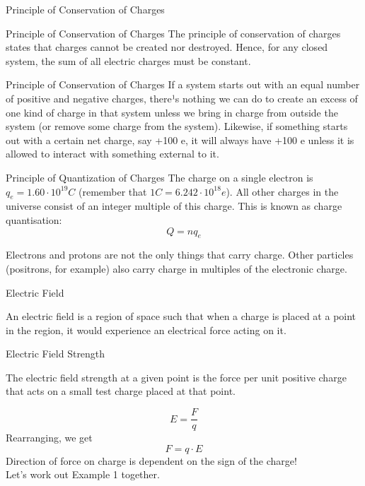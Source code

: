 \documentclass{beamer}
\begin{document}
\begin{frame}{Principle of Conservation of Charges}
\begin{block}{Principle of Conservation of Charges}
The principle of conservation of charges states that charges cannot be created nor destroyed.  Hence, for any closed system, the sum of all electric charges must be constant.
\end{block}
\end{frame}

\begin{frame}{Principle of Conservation of Charges}
If a system starts out with an equal number of positive and negative charges, there¹s nothing we can do to create an excess of one kind of charge in that system unless we bring in charge from outside the system (or remove some charge from the system). Likewise, if something starts out with a certain net charge, say +100 e, it will always have +100 e unless it is allowed to interact with something external to it. 
\end{frame}

\begin{frame}
\begin{block}{Principle of Quantization of Charges}
The charge on a single electron is \(q_e=1.60\cdot10^{19}C\) (remember that \(1C=6.242\cdot 10^{18}e\)). All other charges in the universe consist of an integer multiple of this charge. This is known as charge quantisation:
\[Q=nq_e\]
\end{block}
Electrons and protons are not the only things that carry charge. Other particles (positrons, for example) also carry charge in multiples of the electronic charge.  
\end{frame}

\begin{frame}{Electric Field}{}
\begin{definition}
An electric field is a region of space such that when a charge is placed at a point in the region, it would experience an electrical force acting on it.
\end{definition}
\end{frame}

\begin{frame}{Electric Field Strength}
\begin{definition}
The electric field strength at a given point is the force per unit positive charge that acts on a small test charge placed at that point.
\end{definition}
\[E=\frac{F}{q}\]
Rearranging, we get
\[F=q\cdot E\]
Direction of force on charge is dependent on the sign of the charge!\\
Let's work out Example 1 together.
\end{frame}
\end{document}
